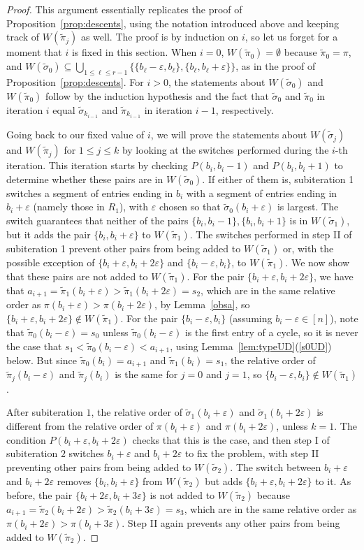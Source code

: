 \documentclass[11pt]{amsart}
\newcommand\wt{\widetilde}
\newcommand\eps{\varepsilon}
\newcommand\sigm{\wt\sigma}
\newcommand\pim{\wt\pi}
\begin{document}
\begin{proof} This argument essentially replicates the proof of Proposition~\ref{prop:descents}, using the notation introduced above and keeping track of $W(\pim_j)$ as well.
The proof is by induction on $i$, so let us forget for a moment that $i$ is fixed in this section.
When $i=0$, $W(\pim_0)=\emptyset$ because $\pim_0=\pi$, and $W(\sigm_0)\subseteq\bigcup_{1\le\ell\le r-1}\{\{b_\ell-\eps,b_\ell\},\{b_\ell,b_\ell+\eps\}\}$, as in the proof of Proposition~\ref{prop:descents}.
For $i>0$, the statements about $W(\sigm_0)$ and $W(\pim_0)$ follow by the induction hypothesis and the fact that $\sigm_0$ and $\pim_0$ in iteration $i$ equal $\sigm_{k_{i-1}}$ and $\pim_{k_{i-1}}$ in iteration $i-1$, respectively.

Going back to our fixed value of $i$, we will prove the statements about $W(\sigm_j)$ and $W(\pim_j)$ for $1\le j\le k$ by looking at the switches performed during the $i$-th iteration.
This iteration starts by checking $P(b_i,b_i-1)$ and $P(b_i,b_i+1)$ to determine whether these pairs are in $W(\sigm_0)$. If either of them is,
subiteration 1 switches a segment of entries ending in $b_i$ with a segment of entries ending in $b_i+\eps$ (namely those in $R_1$), with $\eps$ chosen so that $\sigm_0(b_i+\eps)$ is largest.
The switch guarantees that neither of the pairs $\{b_i,b_i-1\},\{b_i,b_i+1\}$ is in $W(\sigm_1)$,
but it adds the pair $\{b_i,b_i+\eps\}$ to $W(\pim_1)$. The switches performed in step II of subiteration 1 prevent other pairs from being added to $W(\sigm_1)$ or, with the possible exception
of $\{b_i+\eps,b_i+2\eps\}$ and $\{b_i-\eps,b_i\}$, to $W(\pim_1)$. We now show that these pairs are not added to $W(\pim_1)$.
For the pair $\{b_i+\eps,b_i+2\eps\}$, we have that $a_{i+1}=\pim_1(b_i+\eps)>\pim_1(b_i+2\eps)=s_2$, which are in the same relative order as $\pi(b_i+\eps)>\pi(b_i+2\eps)$, by Lemma~\ref{obsa},
so $\{b_i+\eps,b_i+2\eps\}\notin W(\pim_1)$.
For the pair $\{b_i-\eps,b_i\}$ (assuming $b_i-\eps\in[n]$), note that $\pim_0(b_i-\eps)=s_0$ unless $\pim_0(b_i-\eps)$ is the first entry of a cycle,
so it is never the case that $s_1<\pim_0(b_i-\eps)<a_{i+1}$, using Lemma~\ref{lem:typeUD}(\ref{s0UD}) below.
But since $\pim_0(b_i)=a_{i+1}$ and $\pim_1(b_i)=s_1$,
the relative order of $\pim_j(b_i-\eps)$ and $\pim_j(b_i)$ is the same for $j=0$ and $j=1$, so $\{b_i-\eps,b_i\}\notin W(\pim_1)$.

After subiteration $1$, the relative order of $\sigm_1(b_i+\eps)$ and $\sigm_1(b_i+2\eps)$ is different from the relative order of $\pi(b_i+\eps)$ and $\pi(b_i+2\eps)$, unless $k=1$.
The condition $P(b_i+\eps,b_i+2\eps)$ checks that this is the case, and then step I of subiteration $2$
switches $b_i+\eps$ and $b_i+2\eps$ to fix the problem, with step II preventing other pairs from being added to $W(\sigm_2)$. The switch between $b_i+\eps$ and $b_i+2\eps$ removes
$\{b_i,b_i+\eps\}$ from $W(\pim_2)$ but adds $\{b_i+\eps,b_i+2\eps\}$ to it. As before, the pair $\{b_i+2\eps,b_i+3\eps\}$ is not added to $W(\pim_2)$ because
$a_{i+1}=\pim_2(b_i+2\eps)>\pim_2(b_i+3\eps)=s_3$, which are in the same relative order as $\pi(b_i+2\eps)>\pi(b_i+3\eps)$. Step II again prevents any other pairs from being added to $W(\pim_2)$.


\end{proof}
\end{document}
